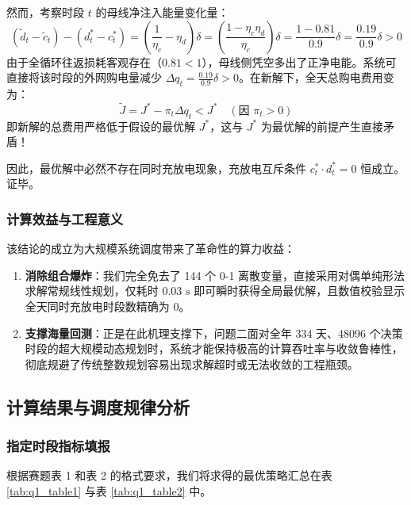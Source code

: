 \documentclass[withoutpreface]{cumcmthesis}
\begin{document}
然而，考察时段 $t$ 的母线净注入能量变化量：
\begin{equation}
    (\widetilde{d}_t - \widetilde{c}_t) - (d_t^* - c_t^*) = \left( \frac{1}{\eta_c} - \eta_d \right) \delta = \left( \frac{1 - \eta_c \eta_d}{\eta_c} \right) \delta = \frac{1 - 0.81}{0.9} \delta = \frac{0.19}{0.9} \delta > 0
\end{equation}
由于全循环往返损耗客观存在（$0.81 < 1$），母线侧凭空多出了正净电能。系统可直接将该时段的外网购电量减少 $\Delta q_t = \frac{0.19}{0.9}\delta > 0$。在新解下，全天总购电费用变为：
\begin{equation}
    \widetilde{J} = J^* - \pi_t \Delta q_t < J^* \quad (\text{因 } \pi_t > 0)
\end{equation}
即新解的总费用严格低于假设的最优解 $J^*$，这与 $J^*$ 为最优解的前提产生直接矛盾！

因此，最优解中必然不存在同时充放电现象，充放电互斥条件 $c_t^* \cdot d_t^* = 0$ 恒成立。证毕。

\subsubsection{计算效益与工程意义}
该结论的成立为大规模系统调度带来了革命性的算力收益：
\begin{enumerate}
    \item \textbf{消除组合爆炸}：我们完全免去了 144 个 0-1 离散变量，直接采用对偶单纯形法求解常规线性规划，仅耗时 $0.03\text{ s}$ 即可瞬时获得全局最优解，且数值校验显示全天同时充放电时段数精确为 0。
    \item \textbf{支撑海量回测}：正是在此机理支撑下，问题二面对全年 334 天、48096 个决策时段的超大规模动态规划时，系统才能保持极高的计算吞吐率与收敛鲁棒性，彻底规避了传统整数规划容易出现求解超时或无法收敛的工程瓶颈。
\end{enumerate}
\subsection{计算结果与调度规律分析}

\subsubsection{指定时段指标填报}

根据赛题表 1 和表 2 的格式要求，我们将求得的最优策略汇总在表 \ref{tab:q1_table1} 与表 \ref{tab:q1_table2} 中。
\end{document}
